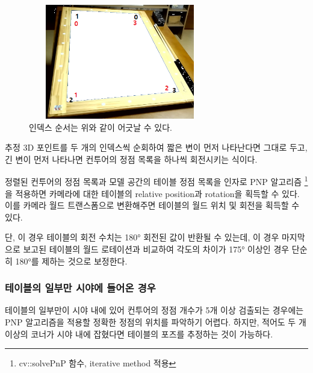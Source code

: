 \documentclass[11pt]{oblivoir}
\begin{document}
    \begin{figure}[ht]
        \begin{center}
            \includegraphics[width=8cm, height=5cm, keepaspectratio]{img/billiards-table-indexes.png}
        \end{center}
        \caption{인덱스 순서는 위와 같이 어긋날 수 있다.}
        \label{fig;pool-table-invalid-index}
    \end{figure}

    추정 3D 포인트를 두 개의 인덱스씩 순회하여 짧은 변이 먼저 나타난다면 그대로 두고, 긴 변이 먼저 나타나면 컨투어의 정점 목록을 하나씩 회전시키는 식이다.

    정렬된 컨투어의 정점 목록과 모델 공간의 테이블 정점 목록을 인자로 PNP 알고리즘
    \footnote{cv::solvePnP 함수, iterative method 적용}
    을 적용하면 카메라에 대한 테이블의 relative position과 rotation을 획득할 수 있다. 이를 카메라 월드 트랜스폼으로 변환해주면 테이블의 월드 위치 및 회전을 획득할 수 있다.

    단, 이 경우 테이블의 회전 수치는 180\si{\degree} 회전된 값이 반환될 수 있는데, 이 경우 마지막으로 보고된 테이블의 월드 로테이션과 비교하여 각도의 차이가 175\si{\degree} 이상인 경우 단순히 180\si{\degree}를 제하는 것으로 보정한다.

    \subsubsection{테이블의 일부만 시야에 들어온 경우}

    테이블의 일부만이 시야 내에 있어 컨투어의 정점 개수가 5개 이상 검출되는 경우에는 PNP 알고리즘을 적용할 정확한 정점의 위치를 파악하기 어렵다. 하지만, 적어도 두 개 이상의 코너가 시야 내에 잡혔다면 테이블의 포즈를 추정하는 것이 가능하다.
\end{document}
